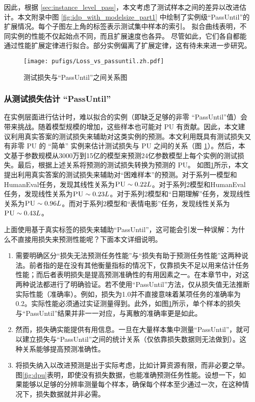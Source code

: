 因此，根据 \ref{sec:instance_level_pass}，本文考虑了测试样本之间的差异以改进估计。本文附录中图 \ref{fig:idp_with_modelsize_part1} 中绘制了实例级“PassUntil”的扩展情况。每个子图左上角的标签表示测试集中样本的索引。
拟合曲线表明，不同实例的性能不仅起始点不同，而且扩展速度也各异。
尽管如此，它们各自都能通过性能扩展定律进行拟合。部分实例偏离了扩展定律，这有待未来进一步研究。 


\begin{figure}[!htbp]
    \centering
    \texttt{[image: pufigs/Loss\_vs\_passuntil.zh.pdf]}
    \caption{测试损失与“PassUntil”之间关系图}
\label{fig:loss_vs_passuntil}
\end{figure}

\subsubsection{从测试损失估计 “PassUntil”}

在实例层面进行估计时，难以拟合的实例（即缺乏足够的非零 “PassUntil”值）会带来挑战。随着模型规模的增加，这些样本也可能对 \textsc{PU} 有贡献。因此，本文建议利用真实答案的测试损失来辅助对这类实例的预测。本文利用既具有测试损失又有非零 \textsc{PU} 的 “简单” 实例来估计测试损失与 \textsc{PU} 之间的关系（图 \ref{fig:loss_vs_passuntil}）。然后，本文基于参数规模从3000万到15亿的模型来预测24亿参数模型上每个实例的测试损失。最后，根据上述关系将预测的测试损失转换为预测的 \textsc{PU}。
如图\ref{fig:loss_vs_passuntil}所示，本文提出利用真实答案的测试损失来辅助对“困难样本”的预测。对于系列一模型和HumanEval任务，发现其线性关系为\(\textsc{PU} \sim 0.22L\)。对于系列2模型和HumanEval任务，发现线性关系为\(\textsc{PU} \sim 0.23L\)。对于系列2模型和“日期理解”任务，发现线性关系为\(\textsc{PU} \sim 0.96L\)。而对于系列2模型和“表情电影”任务，发现线性关系为\(\textsc{PU} \sim 0.43L\)。 

上面使用基于真实标签的损失来辅助“PassUntil”，这可能会引发一种误解：为什么不直接用损失来预测性能呢？下面本文详细说明。
\begin{enumerate}
    \item {需要明确区分“损失无法预测任务性能”与“损失有助于预测任务性能”这两种说法。前者指的是在没有其他衡量指标的情况下，仅靠损失不足以用来估计任务性能；而后者表明损失是提高预测准确性的有用因素之一。在本章节中，对这两种说法都进行了明确验证。若不使用“PassUntil”方法，仅从损失值无法推断实际性能（准确率）。例如，损失为1.0并不直接意味着某项任务的准确率为0.2。实际性能必须通过实证测量得到。此外，如图\ref{fig:loss_vs_passuntil}所示，单个样本的损失与“PassUntil”结果并非一一对应，与离散的准确率更是如此。}
    \item {然而，损失确实能提供有用信息。一旦在大量样本集中测量“PassUntil”，就可以建立损失与“PassUntil”之间的统计关系（仅依靠损失数据则无法做到）。这种关系能够提高预测准确性。}
    \item {将损失纳入以改进预测是出于实际考虑，比如计算资源有限，而非必要之举。图\ref{fig:dpu}表明，即使没有损失数据，也能准确预测任务性能。设想一下，如果能够以足够的分辨率测量每个样本，确保每个样本至少通过一次，在这种情况下，损失数据就并非必需。}
\end{enumerate}



